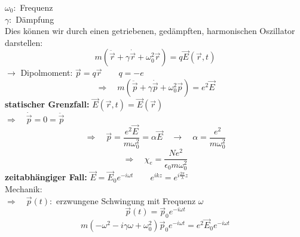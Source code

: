 \begin{center}
\end{center}
$ \omega_0 : $ Frequenz\\
$ \gamma : $ Dämpfung\\
Dies können wir durch einen getriebenen, gedämpften, harmonischen Oszillator darstellen:
\begin{equation*}
m(\ddot{\vec{r}} + \gamma \dot{\vec{r}} + \omega_0^2 \vec{r}) = q \vec{E}(\vec{r},t)
\end{equation*}
$ \rightarrow $ Dipolmoment: $ \vec{p} = q \vec{r} \qquad q = -e $
\begin{equation*}
\Rightarrow \quad m(\ddot{\vec{p}} + \gamma \dot{\vec{p}} + \omega_0^2 \vec{p}) = e^2 \vec{E}
\end{equation*}
\textbf{statischer Grenzfall:} $ \vec{E}(\vec{r},t) = \vec{E}(\vec{r}) $\\
$ \Rightarrow \quad \dot{\vec{p}} = 0 = \ddot{\vec{p}} $\\
\begin{equation*}
\Rightarrow \quad \vec{p} = \frac{e^2 \vec{E}}{m \omega_0^2} = \alpha \vec{E} \quad \rightarrow \quad \alpha = \frac{e^2}{m \omega_0^2}
\end{equation*}
\begin{equation*}
\Rightarrow \quad \chi_e = \frac{N e^2}{\epsilon_0 m \omega_0^2}
\end{equation*}
\textbf{zeitabhängiger Fall:} $ \vec{E} = \vec{E}_0 e^{-i \omega t} \qquad e^{ikz} = e^{i \frac{2 \pi}{\lambda} z} $\\[5pt]
Mechanik:\\
$ \Rightarrow \quad \vec{p}(t) : $ erzwungene Schwingung mit Frequenz $ \omega $
\begin{equation*}
\vec{p}(t) = \vec{p}_0 e^{- i \omega t}
\end{equation*}
\begin{equation*}
m ( - \omega^2 - i \gamma \omega + \omega_0^2) \vec{p}_0 e^{-i \omega t} = e^2 \vec{E}_0 e^{-i \omega t}
\end{equation*}
